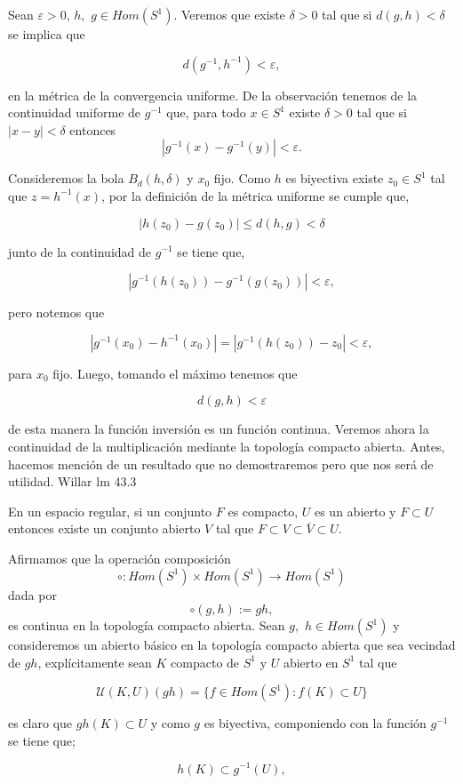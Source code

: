 Sean $\varepsilon >0$, $h,$ $g \in Hom(S^1)$. Veremos que existe $\delta >0$ tal que si $d(g,h) < \delta$  se implica que

$$d(g^{-1},h^{-1}) < \varepsilon,$$

en la métrica de la convergencia uniforme.  De la observación tenemos de la continuidad uniforme de $g^{-1}$  que, para todo $x \in S^1$ existe $\delta >0$ tal que si $|x-y|< \delta$ entonces
$$|g^{-1}(x)-g^{-1}(y)| < \varepsilon.$$

Consideremos la bola $B_d(h,\delta)$ y $x_0$ fijo. Como $h$ es biyectiva existe $z_0 \in S^1$ tal que $z= h^{-1}(x)$, por la definición de la métrica uniforme se cumple que,

$$|h(z_0)-g(z_0)| \leq d(h,g) < \delta $$

junto de la continuidad de $g^{-1}$ se tiene que,

$$|g^{-1}(h(z_0))-g^{-1}(g(z_0))| < \varepsilon,$$

pero notemos que 

$$ |g^{-1}(x_0)-h^{-1}(x_0)|=|g^{-1}(h(z_0))-z_0| < \varepsilon, $$

para $x_0$ fijo. Luego, tomando el máximo tenemos que 

$$d(g,h) < \varepsilon$$

de esta manera la función inversión es un  función continua. Veremos ahora la continuidad de la multiplicación mediante la topología compacto abierta. Antes, hacemos mención de un resultado que no demostraremos pero que nos será de utilidad. Willar lm 43.3

\begin{lm}
En un espacio regular, si un conjunto $F$ es compacto, $U$ es un abierto y $F \subset U$ entonces existe un conjunto abierto $V$ tal que $F \subset V \subset \overline{V} \subset U.$
\end{lm}

Afirmamos que la operación composición 
$$\circ:Hom(S^1) \times Hom(S^1) \to Hom(S^1)$$ dada por 
$$\circ(g,h):=gh,$$
es continua en la topología compacto abierta. Sean $g,$ $h \in Hom(S^1)$ y consideremos un abierto básico en la topología compacto abierta que sea vecindad de $gh$, explícitamente sean $K$ compacto de $S^1$ y $U$ abierto en $S^1$ tal que

$$\mathcal{U}(K,U)(gh)=\{f \in Hom(S^1): f(K) \subset U\}$$

es claro que $gh(K) \subset U$ y como $g$ es biyectiva,  componiendo con la función $g^{-1}$ se tiene que; 

$$h(K) \subset g^{-1}(U),$$

